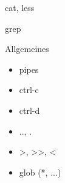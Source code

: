       \begin{frame}{cat, less}
      \end{frame}

      \begin{frame}{grep}
      \end{frame}

      \begin{frame}{Allgemeines}
        \begin{itemize}
          \item pipes\\
          \item ctrl-c\\
          \item ctrl-d\\
          \item .., .\\
          \item >, >>, <\\
          \item glob (*, ...)
        \end{itemize}
      \end{frame}